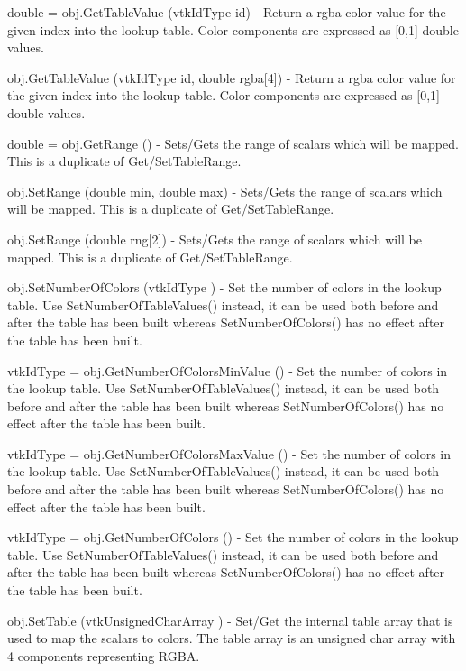 \begin{DoxyItemize}
\item {\ttfamily double = obj.\-Get\-Table\-Value (vtk\-Id\-Type id)} -\/ Return a rgba color value for the given index into the lookup table. Color components are expressed as \mbox{[}0,1\mbox{]} double values.  
\item {\ttfamily obj.\-Get\-Table\-Value (vtk\-Id\-Type id, double rgba\mbox{[}4\mbox{]})} -\/ Return a rgba color value for the given index into the lookup table. Color components are expressed as \mbox{[}0,1\mbox{]} double values.  
\item {\ttfamily double = obj.\-Get\-Range ()} -\/ Sets/\-Gets the range of scalars which will be mapped. This is a duplicate of Get/\-Set\-Table\-Range.  
\item {\ttfamily obj.\-Set\-Range (double min, double max)} -\/ Sets/\-Gets the range of scalars which will be mapped. This is a duplicate of Get/\-Set\-Table\-Range.  
\item {\ttfamily obj.\-Set\-Range (double rng\mbox{[}2\mbox{]})} -\/ Sets/\-Gets the range of scalars which will be mapped. This is a duplicate of Get/\-Set\-Table\-Range.  
\item {\ttfamily obj.\-Set\-Number\-Of\-Colors (vtk\-Id\-Type )} -\/ Set the number of colors in the lookup table. Use Set\-Number\-Of\-Table\-Values() instead, it can be used both before and after the table has been built whereas Set\-Number\-Of\-Colors() has no effect after the table has been built.  
\item {\ttfamily vtk\-Id\-Type = obj.\-Get\-Number\-Of\-Colors\-Min\-Value ()} -\/ Set the number of colors in the lookup table. Use Set\-Number\-Of\-Table\-Values() instead, it can be used both before and after the table has been built whereas Set\-Number\-Of\-Colors() has no effect after the table has been built.  
\item {\ttfamily vtk\-Id\-Type = obj.\-Get\-Number\-Of\-Colors\-Max\-Value ()} -\/ Set the number of colors in the lookup table. Use Set\-Number\-Of\-Table\-Values() instead, it can be used both before and after the table has been built whereas Set\-Number\-Of\-Colors() has no effect after the table has been built.  
\item {\ttfamily vtk\-Id\-Type = obj.\-Get\-Number\-Of\-Colors ()} -\/ Set the number of colors in the lookup table. Use Set\-Number\-Of\-Table\-Values() instead, it can be used both before and after the table has been built whereas Set\-Number\-Of\-Colors() has no effect after the table has been built.  
\item {\ttfamily obj.\-Set\-Table (vtk\-Unsigned\-Char\-Array )} -\/ Set/\-Get the internal table array that is used to map the scalars to colors. The table array is an unsigned char array with 4 components representing R\-G\-B\-A.  

\end{DoxyItemize}
